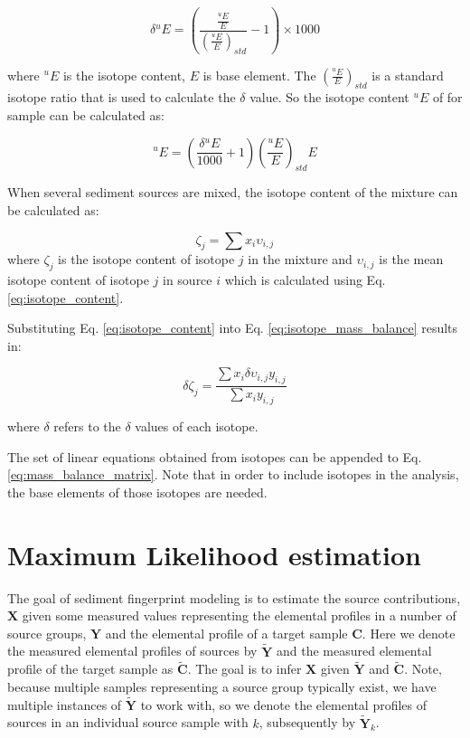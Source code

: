 \begin{equation}
    \delta {^uE} = \left(\frac{\frac{^uE}{E}}{\left(\frac{^uE}{E}\right)_{std}} - 1\right)\times 1000
\end{equation}

where $^uE$ is the isotope content, $E$ is base element. The $\left(\frac{^uE}{E}\right)_{std}$ is a standard isotope ratio that is used to calculate the $\delta$ value. So the isotope content $^uE$ of for sample can be calculated as: 

\begin{equation}\label{eq:isotope_content}
    ^uE = \left(\frac{\delta {^uE}}{1000} + 1\right)\left(\frac{^uE}{E}\right)_{std}E
\end{equation}

When several sediment sources are mixed, the isotope content of the mixture can be calculated as: 

\begin{equation}\label{eq:isotope_mass_balance}
    \zeta_j = \sum x_i \upsilon_{i,j}
\end{equation}
where $\zeta_j$ is the isotope content of isotope $j$ in the mixture and $\upsilon_{i,j}$ is the mean isotope content of isotope $j$ in source $i$ which is calculated using Eq. \eqref{eq:isotope_content}. 

Substituting Eq. \eqref{eq:isotope_content} into Eq. \eqref{eq:isotope_mass_balance} results in: 

\begin{equation}
    \delta \zeta_j = \frac{\sum x_i \delta \upsilon_{i,j}y_{i,j}}{\sum x_i y_{i,j}}
\end{equation}

where $\delta$ refers to the $\delta$ values of each isotope. 

The set of linear equations obtained from isotopes can be appended to Eq. \eqref{eq:mass_balance_matrix}. Note that in order to include isotopes in the analysis, the base elements of those isotopes are needed. 

\section{Maximum Likelihood estimation}
The goal of sediment fingerprint modeling is to estimate the source contributions, $\mathbf{X}$ given some measured values representing the elemental profiles in a number of source groups, $\mathbf{Y}$ and the elemental profile of a target sample $\mathbf{C}$. Here we denote the measured elemental profiles of sources by $\mathbf{\tilde Y}$ and the measured elemental profile of the target sample as $\mathbf{\tilde C}$. The goal is to infer $\mathbf{X}$ given $\mathbf{\tilde Y}$ and $\mathbf{\tilde C}$. Note, because multiple samples representing a source group typically exist, we have multiple instances of $\mathbf{\tilde Y}$ to work with, so we denote the elemental profiles of sources in an individual source sample with $k$, subsequently by $\mathbf{\tilde Y}_k$.

